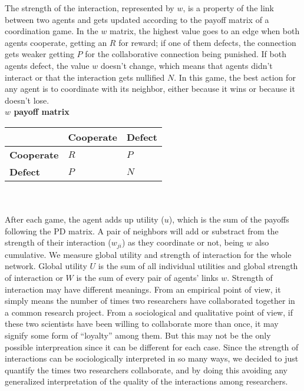 \documentclass{bmcart}
\begin{document}
The strength of the interaction, represented by $w$, is a property of
the link between two agents and gets updated according to the payoff
matrix of a coordination game. In the $w$ matrix, the highest value
goes to an edge when both agents cooperate, getting an $R$ for reward;
if one of them defects, the connection gets weaker getting $P$ for the
collaborative connection being punished. If both agents defect, the
value $w$ doesn't change, which means that agents didn't interact or
that the interaction gets nullified $N$. In this game, the best action
for any agent is to coordinate with its neighbor, either because it
wins or because it doesn't lose. \\

{\bf $w$ payoff matrix}\\

\begin{tabular}{| l | l | l |}
\hline
          & \bf{Cooperate} & \bf{Defect} \\ \hline
\bf{Cooperate} &  $R$      &  $P$   \\ \hline
\bf{Defect}    &  $P$      &  $N$   \\ \hline

\end{tabular}\\ \\


After each game, the agent adds up utility ($u$), which is the sum of the
payoffs following the PD matrix. A pair of neighbors will add or substract from
the strength of their interaction ($w_{ji}$) as they coordinate or not, being
$w$ also cumulative. We measure global utility and strength of interaction for
the whole network. Global utility $U$ is the sum of all individual utilities and
global strength of interaction or $W$ is the sum of every pair of agents' links
$w$. {\color{red}Strength of interaction may have different meanings. From an empirical
point of view, it simply means the number of times two researchers have
collaborated together in a common research project. From a sociological and
qualitative point of view, if these two scientists have been willing to
collaborate more than once, it may signify some form of ``loyalty'' among them. But
this may not be the only possible interpreation since it can be different for
each case. Since the strength of interactions can be sociologically interpreted
in so many ways, we decided to just quantify the  times two researchers
collaborate, and by doing this avoiding any generalized interpretation of the
quality of the interactions among researchers.} \\ 
\end{document}
